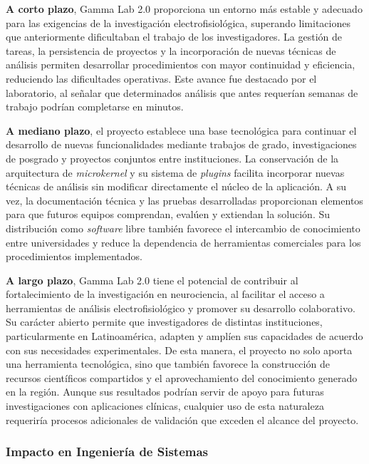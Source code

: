 \documentclass[12pt,letterpaper,oneside]{article}
\begin{document}
\textbf{A corto plazo}, Gamma Lab 2.0 proporciona un entorno más estable y adecuado para las exigencias de la investigación electrofisiológica, superando limitaciones que anteriormente dificultaban el trabajo de los investigadores. La gestión de tareas, la persistencia de proyectos y la incorporación de nuevas técnicas de análisis permiten desarrollar procedimientos con mayor continuidad y eficiencia, reduciendo las dificultades operativas. Este avance fue destacado por el laboratorio, al señalar que determinados análisis que antes requerían semanas de trabajo podrían completarse en minutos.

\textbf{A mediano plazo}, el proyecto establece una base tecnológica para continuar el desarrollo de nuevas funcionalidades mediante trabajos de grado, investigaciones de posgrado y proyectos conjuntos entre instituciones. La conservación de la arquitectura de \textit{microkernel} y su sistema de \textit{plugins} facilita incorporar nuevas técnicas de análisis sin modificar directamente el núcleo de la aplicación. A su vez, la documentación técnica y las pruebas desarrolladas proporcionan elementos para que futuros equipos comprendan, evalúen y extiendan la solución. Su distribución como \textit{software} libre también favorece el intercambio de conocimiento entre universidades y reduce la dependencia de herramientas comerciales para los procedimientos implementados.

\textbf{A largo plazo}, Gamma Lab 2.0 tiene el potencial de contribuir al fortalecimiento de la investigación en neurociencia, al facilitar el acceso a herramientas de análisis electrofisiológico y promover su desarrollo colaborativo. Su carácter abierto permite que investigadores de distintas instituciones, particularmente en Latinoamérica, adapten y amplíen sus capacidades de acuerdo con sus necesidades experimentales. De esta manera, el proyecto no solo aporta una herramienta tecnológica, sino que también favorece la construcción de recursos científicos compartidos y el aprovechamiento del conocimiento generado en la región. Aunque sus resultados podrían servir de apoyo para futuras investigaciones con aplicaciones clínicas, cualquier uso de esta naturaleza requeriría procesos adicionales de validación que exceden el alcance del proyecto.

\subsubsection{Impacto en Ingeniería de Sistemas}
\end{document}
